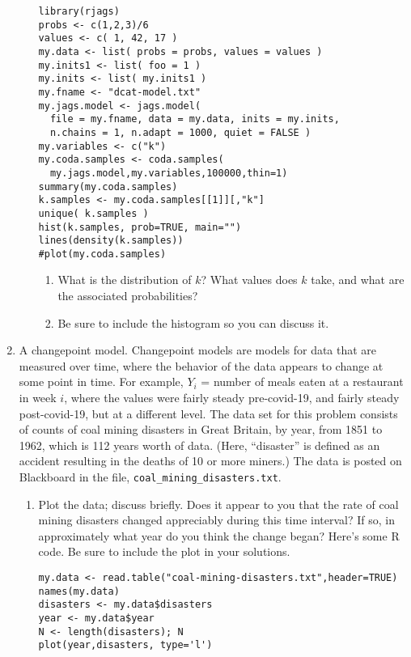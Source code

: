 \documentclass[11pt]{article}
\begin{document}
\begin{enumerate}
\begin{enumerate}
\begin{verbatim}
library(rjags)
probs <- c(1,2,3)/6
values <- c( 1, 42, 17 )
my.data <- list( probs = probs, values = values )
my.inits1 <- list( foo = 1 )
my.inits <- list( my.inits1 )
my.fname <- "dcat-model.txt"
my.jags.model <- jags.model(
  file = my.fname, data = my.data, inits = my.inits,
  n.chains = 1, n.adapt = 1000, quiet = FALSE )
my.variables <- c("k")
my.coda.samples <- coda.samples(
  my.jags.model,my.variables,100000,thin=1)
summary(my.coda.samples)
k.samples <- my.coda.samples[[1]][,"k"]
unique( k.samples )
hist(k.samples, prob=TRUE, main="")
lines(density(k.samples))
#plot(my.coda.samples)
\end{verbatim}


\begin{enumerate}
\item What is the distribution of $k$? What values does $k$ take, and what are the
associated probabilities?
\item Be sure to include the histogram so you can discuss it.
\end{enumerate}

\end{enumerate}

\item A changepoint model.  Changepoint models are models for data that
are measured over time, where the behavior of the data appears to change
at some point in time. For example, $Y_i$ = number of meals eaten at a restaurant in
week $i$, where the values were fairly steady pre-covid-19, and fairly steady post-covid-19,
but at a different level. The data set for this problem consists of 
counts of coal mining disasters in Great Britain, by year, from 1851 to 1962, which
is 112 years worth of data.
 (Here, ``disaster'' is defined as an accident resulting in the deaths 
of 10 or more miners.)
The data is posted on Blackboard in the file, \verb+coal_mining_disasters.txt+.

\begin{enumerate}
\item Plot the data; discuss briefly. Does it appear to you that the rate of
coal mining disasters changed appreciably during this time interval? If so, in 
approximately what year do you think the change began? Here's some R code.
Be sure to include the plot in your solutions.

\begin{verbatim}
my.data <- read.table("coal-mining-disasters.txt",header=TRUE)
names(my.data)
disasters <- my.data$disasters
year <- my.data$year
N <- length(disasters); N
plot(year,disasters, type='l')
\end{verbatim}


\end{enumerate}
\end{enumerate}
\end{document}
